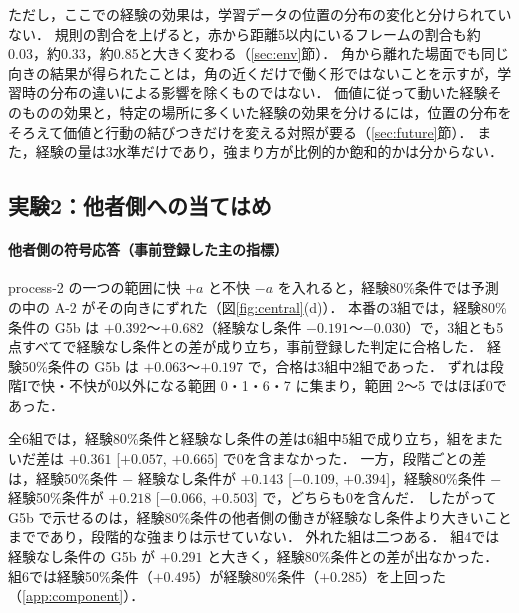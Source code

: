 ただし，ここでの経験の効果は，学習データの位置の分布の変化と分けられていない．
規則の割合を上げると，赤から距離5以内にいるフレームの割合も約0.03，約0.33，約0.85と大きく変わる（\ref{sec:env}節）．
角から離れた場面でも同じ向きの結果が得られたことは，角の近くだけで働く形ではないことを示すが，学習時の分布の違いによる影響を除くものではない．
価値に従って動いた経験そのものの効果と，特定の場所に多くいた経験の効果を分けるには，位置の分布をそろえて価値と行動の結びつきだけを変える対照が要る（\ref{sec:future}節）．
また，経験の量は3水準だけであり，強まり方が比例的か飽和的かは分からない．

\subsection{実験2：他者側への当てはめ}\label{sec:res-other}

\paragraph{他者側の符号応答（事前登録した主の指標）}
process-2 の一つの範囲に快 $+a$ と不快 $-a$ を入れると，経験80\%条件では予測の中の A-2 がその向きにずれた（図\ref{fig:central}(d)）．
本番の3組では，経験80\%条件の G5b は $+0.392$〜$+0.682$（経験なし条件 $-0.191$〜$-0.030$）で，3組とも5点すべてで経験なし条件との差が成り立ち，事前登録した判定に合格した．
経験50\%条件の G5b は $+0.063$〜$+0.197$ で，合格は3組中2組であった．
ずれは段階Iで快・不快が0以外になる範囲 0・1・6・7 に集まり，範囲 2〜5 ではほぼ0であった．

全6組では，経験80\%条件と経験なし条件の差は6組中5組で成り立ち，組をまたいだ差は $+0.361$ [$+0.057$, $+0.665$] で0を含まなかった．
一方，段階ごとの差は，経験50\%条件 $-$ 経験なし条件が $+0.143$ [$-0.109$, $+0.394$]，経験80\%条件 $-$ 経験50\%条件が $+0.218$ [$-0.066$, $+0.503$] で，どちらも0を含んだ．
したがって G5b で示せるのは，経験80\%条件の他者側の働きが経験なし条件より大きいことまでであり，段階的な強まりは示せていない．
外れた組は二つある．
組4では経験なし条件の G5b が $+0.291$ と大きく，経験80\%条件との差が出なかった．
組6では経験50\%条件（$+0.495$）が経験80\%条件（$+0.285$）を上回った（\ref{app:component}）．


